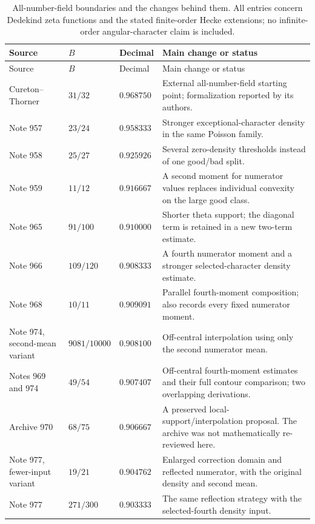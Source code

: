 \small
\begin{longtable}{@{}>{\raggedright\arraybackslash}p{3.0cm}p{2.0cm}p{2.0cm}>{\raggedright\arraybackslash}p{6.6cm}@{}}
\caption{All-number-field boundaries and the changes behind them. All entries concern Dedekind zeta functions and the stated finite-order Hecke extensions; no infinite-order angular-character claim is included.}\label{tab:all-field-boundaries}\\
\toprule
Source & $B$ & Decimal & Main change or status\\
\midrule\endfirsthead
\toprule Source & $B$ & Decimal & Main change or status\\\midrule\endhead
\bottomrule\endfoot
Cureton--Thorner \cite{CT26} & $31/32$ & $0.968750$ & External all-number-field starting point; formalization reported by its authors.\\[4pt]
Note 957 \cite{R957} & $23/24$ & $0.958333$ & Stronger exceptional-character density in the same Poisson family.\\[4pt]
Note 958 \cite{R958} & $25/27$ & $0.925926$ & Several zero-density thresholds instead of one good/bad split.\\[4pt]
Note 959 \cite{R959} & $11/12$ & $0.916667$ & A second moment for numerator values replaces individual convexity on the large good class.\\[4pt]
Note 965 \cite{R965} & $91/100$ & $0.910000$ & Shorter theta support; the diagonal term is retained in a new two-term estimate.\\[4pt]
Note 966 \cite{R966} & $109/120$ & $0.908333$ & A fourth numerator moment and a stronger selected-character density estimate.\\[4pt]
Note 968 \cite{R968} & $10/11$ & $0.909091$ & Parallel fourth-moment composition; also records every fixed numerator moment.\\[4pt]
Note 974, second-mean variant \cite{R974} & $9081/10000$ & $0.908100$ & Off-central interpolation using only the second numerator mean.\\[4pt]
Notes 969 and 974 \cite{R969,R974} & $49/54$ & $0.907407$ & Off-central fourth-moment estimates and their full contour comparison; two overlapping derivations.\\[4pt]
Archive 970 \cite{R970} & $68/75$ & $0.906667$ & A preserved local-support/interpolation proposal. The archive was not mathematically re-reviewed here.\\[4pt]
Note 977, fewer-input variant \cite{R977} & $19/21$ & $0.904762$ & Enlarged correction domain and reflected numerator, with the original density and second mean.\\[4pt]
Note 977 \cite{R977} & $271/300$ & $0.903333$ & The same reflection strategy with the selected-fourth density input.\\
\end{longtable}
\normalsize

